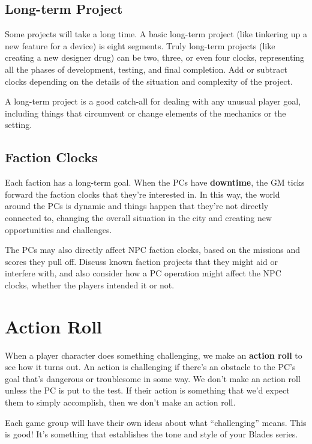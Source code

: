 \subsection{Long-term Project}

Some projects will take a long time. A basic long-term project (like tinkering up a new feature for a device) is eight segments. Truly long-term projects (like creating a new designer drug) can be two, three, or even four clocks, representing all the phases of development, testing, and final completion. Add or subtract clocks depending on the details of the situation and complexity of the project.

A long-term project is a good catch-all for dealing with any unusual player goal, including things that circumvent or change elements of the mechanics or the setting.

\subsection{Faction Clocks}

Each faction has a long-term goal. When the PCs have \textbf{downtime}, the GM ticks forward the faction clocks that they’re interested in. In this way, the world around the PCs is dynamic and things happen that they’re not directly connected to, changing the overall situation in the city and creating new opportunities and challenges.

The PCs may also directly affect NPC faction clocks, based on the missions and scores they pull off. Discuss known faction projects that they might aid or interfere with, and also consider how a PC operation might affect the NPC clocks, whether the players intended it or not.

\section{Action Roll}


When a player character does something challenging, we make an \textbf{action roll} to see how it turns out. An action is challenging if there’s an obstacle to the PC’s goal that’s dangerous or troublesome in some way. We don’t make an action roll unless the PC is put to the test. If their action is something that we’d expect them to simply accomplish, then we don’t make an action roll.

\begin{qb}Each game group will have their own ideas about what ``challenging'' means. This is good! It’s something that establishes the tone and style of your Blades series.\end{qb}

